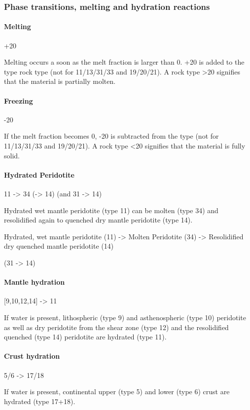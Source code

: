 \subsubsection{Phase transitions, melting and hydration reactions}

\paragraph{Melting}
+20

Melting occurs a soon as the melt fraction is larger than 0.
+20 is added to the type rock type (not for 11/13/31/33 and 19/20/21). A rock type >20 signifies that the material is partially molten.

\paragraph{Freezing}
-20

If the melt fraction becomes 0, -20 is subtracted from the type (not for 11/13/31/33 and 19/20/21). A rock type <20 signifies that the material is fully solid.

\paragraph{Hydrated Peridotite}
11 -> 34 (-> 14) (and 31 -> 14)

Hydrated wet mantle peridotite (type 11) can be molten (type 34) and resolidified again to quenched dry mantle peridotite (type 14).

Hydrated, wet mantle peridotite (11) -> Molten Peridotite (34) -> Resolidified dry quenched mantle peridotite (14)

(31 -> 14)

\paragraph{Mantle hydration}
[9,10,12,14] -> 11

If water is present, lithospheric (type 9) and asthenospheric (type 10) peridotite as well as dry peridotite from the shear zone (type 12) and the resolidified quenched (type 14) peridotite are hydrated (type 11).

\paragraph{Crust hydration}
5/6 -> 17/18

If water is present, continental upper (type 5) and lower (type 6) crust are hydrated (type 17+18).

